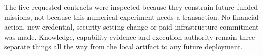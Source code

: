 The five requested contracts were inspected because they constrain future funded missions, not because this numerical experiment needs a transaction. No financial action, new credential, security-setting change or paid infrastructure commitment was made. Knowledge, capability evidence and execution authority remain three separate things all the way from the local artifact to any future deployment.
